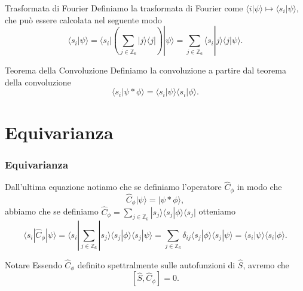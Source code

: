 \documentclass[xcolor=dvipsnames]{beamer}
\newcommand{\Z}{\mathbb{Z}}
\begin{document}
\begin{frame}
    \begin{block}{Trasformata di Fourier}
        Definiamo la trasformata di Fourier come $\langle i | \psi \rangle \mapsto \langle s_i | \psi \rangle $, 
        che può essere calcolata nel seguente modo
        \[ \langle s_i | \psi \rangle = \langle s_i | \left( \sum_{j \in \Z_6} | j \rangle \langle j| \right) | \psi \rangle = 
        \sum_{j \in \Z_6} \langle s_i| j \rangle \langle j | \psi \rangle. \]
    \end{block}
    \begin{block}{Teorema della Convoluzione}
        Definiamo la convoluzione a partire dal teorema della convoluzione
        \[\langle s_i | \psi * \phi \rangle = \langle s_i | \psi \rangle \langle s_i | \phi \rangle . \]
    \end{block}
\end{frame}

\section{Equivarianza}

\begin{frame}
    \frametitle{Equivarianza}
    Dall'ultima equazione notiamo che se definiamo l'operatore $\widehat{C}_\phi$ in modo che
    \[ \widehat{C}_\phi | \psi \rangle = | \psi * \phi \rangle, \]
    abbiamo che se definiamo $\widehat{C}_\phi = \sum_{j \in \Z_6} | s_j \rangle \langle s_j | \phi \rangle \langle s_j | $ otteniamo
    \[\langle s_i | \widehat{C}_\phi |\psi \rangle = \langle s_i | \sum_{j \in \Z_6} | s_j\rangle \langle s_j | \phi \rangle \langle s_j |\psi \rangle 
    = \sum_{j \in \Z_6} \delta_{ij} \langle s_j | \phi \rangle \langle s_j |\psi \rangle = \langle s_i | \psi \rangle \langle s_i | \phi \rangle. \]
    \begin{block}{Notare}
        Essendo $\widehat{C}_\phi$ definito spettralmente sulle autofunzioni di $\widehat{S}$, avremo che
        \[ [ \widehat{S}, \widehat{C}_\phi] = 0 .\]
    \end{block}
\end{frame}
\end{document}
